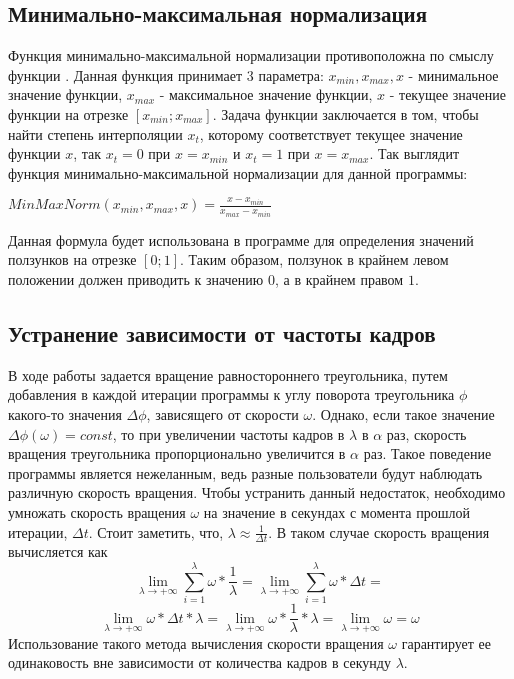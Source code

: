 \documentclass[14pt]{extarticle}
\begin{document}
{\begin{spacing}{1.5}
{        \subsection{Минимально-максимальная нормализация}
        \label{sec:minmaxnorm}
        \par
    }
    Функция минимально-максимальной нормализации противоположна по смыслу функции
    \hyperref[sec:lerp]{}. Данная функция принимает 3 параметра: $x_{min}, x_{max}, x$ - минимальное значение функции, $x_{max}$ - максимальное значение функции, $x$ - текущее значение функции на отрезке $[x_{min}; x_{max}]$. Задача функции заключается в том, чтобы найти степень интерполяции $x_t$, которому соответствует текущее значение функции $x$, так $x_t = 0$ при $x = x_{min}$ и $x_t = 1$ при $x = x_{max}$. Так выглядит функция минимально-максимальной нормализации для данной программы:\par\vspace{1em}
    \begin{center}
        $MinMaxNorm(x_{min}, x_{max}, x) = \frac{x - x_{min}}{x_{max} - x_{min}}$
    \end{center}
    Данная формула будет использована в программе для определения значений ползунков на отрезке $[0; 1]$. Таким образом, ползунок в крайнем левом положении должен приводить к значению $0$, а в крайнем правом $1$.
    \par

    {
        \par
        \subsection{Устранение зависимости от частоты кадров}
        \label{sec:fps}
        \par
    }
    
    В ходе работы задается вращение равностороннего треугольника, путем добавления в каждой итерации программы к углу поворота треугольника $\phi$ какого-то значения $\Delta\phi$, зависящего от скорости $\omega$. Однако, если такое значение $\Delta\phi(\omega) = const$, то при увеличении частоты кадров в $\lambda$ в $\alpha$ раз, скорость вращения треугольника пропорционально увеличится в $\alpha$ раз. Такое поведение программы является нежеланным, ведь разные пользователи будут наблюдать различную скорость вращения.
    Чтобы устранить данный недостаток, необходимо умножать скорость вращения $\omega$ на значение в секундах с момента прошлой итерации, $\Delta{t}$. Стоит заметить, что, $\lambda \approx \frac{1}{\Delta{t}}$. В таком случае скорость вращения вычисляется как \[ \lim_{\lambda\to+\infty} \sum_{i=1}^{\lambda} \omega * \frac{1}{\lambda} = \lim_{\lambda\to+\infty} \sum_{i=1}^{\lambda} \omega * \Delta{t} = \]
    \[ \lim_{\lambda\to+\infty} \omega * \Delta{t} * \lambda = \lim_{\lambda\to+\infty} \omega * \frac{1}{\lambda} * \lambda = \lim_{\lambda\to+\infty} \omega = \omega \]
    Использование такого метода вычисления скорости вращения $\omega$ гарантирует ее одинаковость вне зависимости от количества кадров в секунду $\lambda$.
    \par


\end{spacing}}
\end{document}
